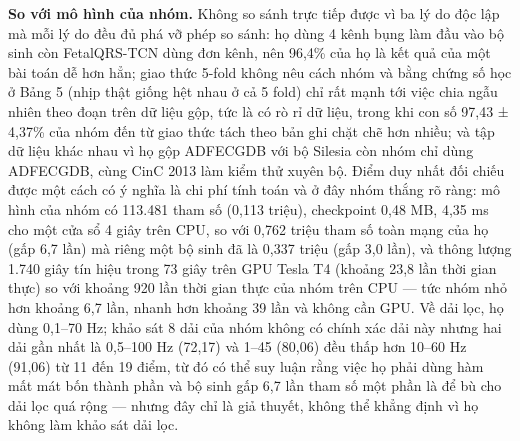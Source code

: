 \documentclass[12pt,a4paper]{article}
\begin{document}
\noindent \textbf{\color{tdtblue}So với mô hình của nhóm.} Không so sánh trực tiếp được vì ba lý do độc lập mà mỗi lý do đều đủ phá vỡ phép so sánh: họ dùng 4 kênh bụng làm đầu vào bộ sinh còn FetalQRS-TCN dùng đơn kênh, nên 96,4\% của họ là kết quả của một bài toán dễ hơn hẳn; giao thức 5-fold không nêu cách nhóm và bằng chứng số học ở Bảng 5 (nhịp thật giống hệt nhau ở cả 5 fold) chỉ rất mạnh tới việc chia ngẫu nhiên theo đoạn trên dữ liệu gộp, tức là có rò rỉ dữ liệu, trong khi con số 97,43 ± 4,37\% của nhóm đến từ giao thức tách theo bản ghi chặt chẽ hơn nhiều; và tập dữ liệu khác nhau vì họ gộp ADFECGDB với bộ Silesia còn nhóm chỉ dùng ADFECGDB, cùng CinC 2013 làm kiểm thử xuyên bộ. Điểm duy nhất đối chiếu được một cách có ý nghĩa là chi phí tính toán và ở đây nhóm thắng rõ ràng: mô hình của nhóm có 113.481 tham số (0,113 triệu), checkpoint 0,48 MB, 4,35 ms cho một cửa sổ 4 giây trên CPU, so với 0,762 triệu tham số toàn mạng của họ (gấp 6,7 lần) mà riêng một bộ sinh đã là 0,337 triệu (gấp 3,0 lần), và thông lượng 1.740 giây tín hiệu trong 73 giây trên GPU Tesla T4 (khoảng 23,8 lần thời gian thực) so với khoảng 920 lần thời gian thực của nhóm trên CPU — tức nhóm nhỏ hơn khoảng 6,7 lần, nhanh hơn khoảng 39 lần và không cần GPU. Về dải lọc, họ dùng 0,1–70 Hz; khảo sát 8 dải của nhóm không có chính xác dải này nhưng hai dải gần nhất là 0,5–100 Hz (72,17) và 1–45 (80,06) đều thấp hơn 10–60 Hz (91,06) từ 11 đến 19 điểm, từ đó có thể suy luận rằng việc họ phải dùng hàm mất mát bốn thành phần và bộ sinh gấp 6,7 lần tham số một phần là để bù cho dải lọc quá rộng — nhưng đây chỉ là giả thuyết, không thể khẳng định vì họ không làm khảo sát dải lọc.\par\vspace{3pt}
\end{document}
